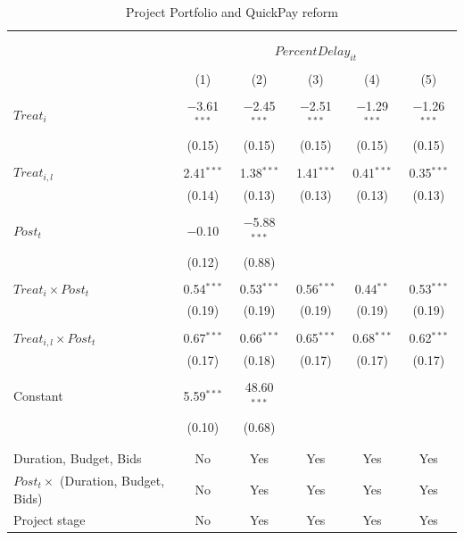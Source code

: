 \documentclass[
]{article}
\begin{document}
\begin{table}[H] \centering 
  \caption{Project Portfolio and QuickPay reform} 
  \label{} 
\small 
\begin{tabular}{@{\extracolsep{-2pt}}lccccc} 
\\[-1.8ex]\hline 
\hline \\[-1.8ex] 
\\[-1.8ex] & \multicolumn{5}{c}{$PercentDelay_{it}$  } \\ 
\\[-1.8ex] & (1) & (2) & (3) & (4) & (5)\\ 
\hline \\[-1.8ex] 
 $Treat_i$ & $-$3.61$^{***}$ & $-$2.45$^{***}$ & $-$2.51$^{***}$ & $-$1.29$^{***}$ & $-$1.26$^{***}$ \\ 
  & (0.15) & (0.15) & (0.15) & (0.15) & (0.15) \\ 
  & & & & & \\ 
 $Treat_{i,l}$ & 2.41$^{***}$ & 1.38$^{***}$ & 1.41$^{***}$ & 0.41$^{***}$ & 0.35$^{***}$ \\ 
  & (0.14) & (0.13) & (0.13) & (0.13) & (0.13) \\ 
  & & & & & \\ 
 $Post_t$ & $-$0.10 & $-$5.88$^{***}$ &  &  &  \\ 
  & (0.12) & (0.88) &  &  &  \\ 
  & & & & & \\ 
 $Treat_i \times Post_t$ & 0.54$^{***}$ & 0.53$^{***}$ & 0.56$^{***}$ & 0.44$^{**}$ & 0.53$^{***}$ \\ 
  & (0.19) & (0.19) & (0.19) & (0.19) & (0.19) \\ 
  & & & & & \\ 
 $Treat_{i,l} \times Post_t$ & 0.67$^{***}$ & 0.66$^{***}$ & 0.65$^{***}$ & 0.68$^{***}$ & 0.62$^{***}$ \\ 
  & (0.17) & (0.18) & (0.17) & (0.17) & (0.17) \\ 
  & & & & & \\ 
 Constant & 5.59$^{***}$ & 48.60$^{***}$ &  &  &  \\ 
  & (0.10) & (0.68) &  &  &  \\ 
  & & & & & \\ 
\hline \\[-1.8ex] 
Duration, Budget, Bids & No & Yes & Yes & Yes & Yes \\ 
$Post_t \times $  (Duration, Budget, Bids) & No & Yes & Yes & Yes & Yes \\ 
Project stage & No & Yes & Yes & Yes & Yes \\ 

\end{tabular}
\end{table}
\end{document}
